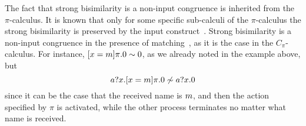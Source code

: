 The fact that strong bisimilarity is a non-input congruence is inherited from the $\pi$-calculus. It is known that only for some specific sub-calculi of the $\pi$-calculus the strong bisimilarity is preserved by the input construct~\cite{DBLP:journals/acta/BorealeS98,  DBLP:journals/lmcs/HirschkoffP08, DBLP:conf/icalp/HirschkoffP10,  pi_calculus}.
Strong bisimilarity is a non-input congruence in the presence of matching~\cite{DBLP:journals/tcs/BorealeS98}, as it is the case in the $C_\pi$-calculus.
For instance, $[ x = m ]\pi.0\sim 0$, as we already noted in the example above, but  
\[
a?x.[ x = m ]\pi.0\not\sim a?x.0
\]
 since it can be the case that the received name is $m$, and then the action specified by $\pi$ is activated, while the other process terminates no matter what name is received.

